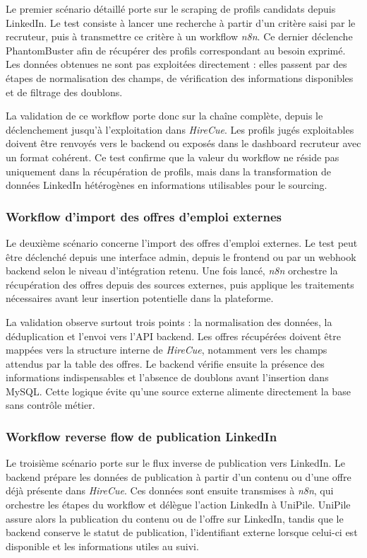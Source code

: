 Le premier scénario détaillé porte sur le scraping de profils candidats depuis LinkedIn. Le test consiste à lancer une recherche à partir d'un critère saisi par le recruteur, puis à transmettre ce critère à un workflow \textit{n8n}. Ce dernier déclenche PhantomBuster afin de récupérer des profils correspondant au besoin exprimé. Les données obtenues ne sont pas exploitées directement : elles passent par des étapes de normalisation des champs, de vérification des informations disponibles et de filtrage des doublons.

La validation de ce workflow porte donc sur la chaîne complète, depuis le déclenchement jusqu'à l'exploitation dans \textit{HireCue}. Les profils jugés exploitables doivent être renvoyés vers le backend ou exposés dans le dashboard recruteur avec un format cohérent. Ce test confirme que la valeur du workflow ne réside pas uniquement dans la récupération de profils, mais dans la transformation de données LinkedIn hétérogènes en informations utilisables pour le sourcing.

\subsubsection{Workflow d'import des offres d'emploi externes}

Le deuxième scénario concerne l'import des offres d'emploi externes. Le test peut être déclenché depuis une interface admin, depuis le frontend ou par un webhook backend selon le niveau d'intégration retenu. Une fois lancé, \textit{n8n} orchestre la récupération des offres depuis des sources externes, puis applique les traitements nécessaires avant leur insertion potentielle dans la plateforme.

La validation observe surtout trois points : la normalisation des données, la déduplication et l'envoi vers l'API backend. Les offres récupérées doivent être mappées vers la structure interne de \textit{HireCue}, notamment vers les champs attendus par la table des offres. Le backend vérifie ensuite la présence des informations indispensables et l'absence de doublons avant l'insertion dans MySQL. Cette logique évite qu'une source externe alimente directement la base sans contrôle métier.

\subsubsection{Workflow reverse flow de publication LinkedIn}

Le troisième scénario porte sur le flux inverse de publication vers LinkedIn. Le backend prépare les données de publication à partir d'un contenu ou d'une offre déjà présente dans \textit{HireCue}. Ces données sont ensuite transmises à \textit{n8n}, qui orchestre les étapes du workflow et délègue l'action LinkedIn à UniPile. UniPile assure alors la publication du contenu ou de l'offre sur LinkedIn, tandis que le backend conserve le statut de publication, l'identifiant externe lorsque celui-ci est disponible et les informations utiles au suivi.


